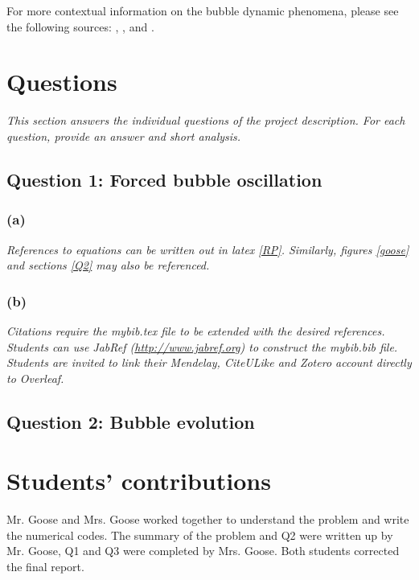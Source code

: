 \documentclass[12pt]{article}
\begin{document}
For more contextual information on the bubble dynamic phenomena, please see the following sources: \cite{Hilgenfeldt1998}, \cite{Kreider2011}, and \cite{Lohse2003}.



\section{Questions}
\emph{This section answers the individual questions of the project description.  For each question, provide an answer and short analysis.}
\subsection*{Question 1: Forced bubble oscillation}
\subsubsection*{(a)} \emph{References to equations can be written out in latex \eqref{RP}. Similarly, figures  \ref{goose} and sections \ref{Q2} may also be referenced.}
\subsubsection*{(b)} \emph{Citations require the mybib.tex file to be extended with the desired references. Students can use JabRef (\url{http://www.jabref.org}) to construct the mybib.bib file. Students are invited to link their Mendelay, CiteULike and Zotero account directly to Overleaf. }

\subsection{Question 2: Bubble evolution \label{Q2}}


\vfill

\section*{Students' contributions}
Mr. Goose and Mrs. Goose worked together to understand the problem and write the numerical codes. The summary of the problem and Q2 were written up by Mr. Goose, Q1 and Q3 were completed by Mrs. Goose. Both students corrected the final report.

\newpage

\end{document}
